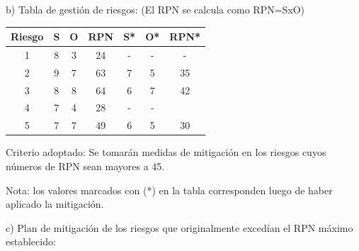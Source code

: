 \documentclass[11pt]{charter}
\begin{document}
b) Tabla de gestión de riesgos:      (El RPN se calcula como RPN=SxO)

\begin{table}[H]
\centering
\begin{tabular}{|c|c|c|c|c|c|c|}
\hline
\rowcolor[HTML]{C0C0C0} 
Riesgo & S & O & RPN & S* & O* & RPN* \\ \hline
1      & 8 & 3 & 24  & -  &  - & -    \\ \hline
2      & 9 & 7 & 63  & 7  & 5  & 35   \\ \hline
3      & 8 & 8 & 64  & 6  & 7  & 42     \\ \hline
4      & 7 & 4 & 28  & -  & -  &      \\ \hline
5      & 7 & 7 & 49  & 6  & 5  & 30   \\ \hline
\end{tabular}
\end{table}

Criterio adoptado: 
Se tomarán medidas de mitigación en los riesgos cuyos números de RPN sean mayores a 45.

Nota: los valores marcados con (*) en la tabla corresponden luego de haber aplicado la mitigación.

c) Plan de mitigación de los riesgos que originalmente excedían el RPN máximo establecido:
\end{document}
